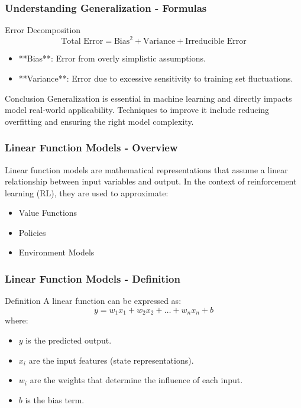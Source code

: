 \documentclass[aspectratio=169]{beamer}
\begin{document}
\begin{frame}[fragile]
    \frametitle{Understanding Generalization - Formulas}
    \begin{block}{Error Decomposition}
        \begin{equation}
            \text{Total Error} = \text{Bias}^2 + \text{Variance} + \text{Irreducible Error}
        \end{equation}
        \begin{itemize}
            \item **Bias**: Error from overly simplistic assumptions.
            \item **Variance**: Error due to excessive sensitivity to training set fluctuations.
        \end{itemize}
    \end{block}
    
    \begin{block}{Conclusion}
        Generalization is essential in machine learning and directly impacts model real-world applicability. Techniques to improve it include reducing overfitting and ensuring the right model complexity.
    \end{block}
\end{frame}

\begin{frame}[fragile]
    \frametitle{Linear Function Models - Overview}
    Linear function models are mathematical representations that assume a linear relationship between input variables and output. In the context of reinforcement learning (RL), they are used to approximate:
    \begin{itemize}
        \item Value Functions
        \item Policies
        \item Environment Models
    \end{itemize}
\end{frame}

\begin{frame}[fragile]
    \frametitle{Linear Function Models - Definition}
    \begin{block}{Definition}
        A linear function can be expressed as:
        \begin{equation}
        y = w_1 x_1 + w_2 x_2 + \ldots + w_n x_n + b
        \end{equation}
        where:
        \begin{itemize}
            \item \(y\) is the predicted output.
            \item \(x_i\) are the input features (state representations).
            \item \(w_i\) are the weights that determine the influence of each input.
            \item \(b\) is the bias term.
        \end{itemize}
    \end{block}
\end{frame}
\end{document}
